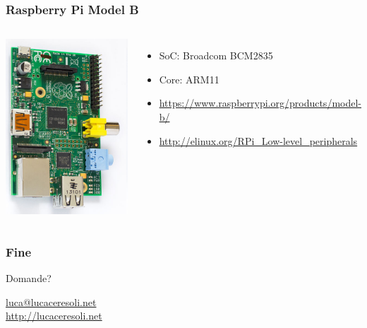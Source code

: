 \documentclass[xetex,table]{beamer}
\begin{document}
\begin{frame}
  \frametitle{Raspberry Pi Model B}
  \begin{columns}
    \includegraphics[width=\textwidth]{images/raspberry-pi-model-b.jpg}
    \begin{itemize}
    \item SoC: Broadcom BCM2835
    \item Core: ARM11
    \item \url{https://www.raspberrypi.org/products/model-b/}
    \item \url{http://elinux.org/RPi_Low-level_peripherals}
    \end{itemize}
  \end{columns}
\end{frame}

\begin{frame}
\frametitle{Fine}

  \begin{center}
    {\Huge Domande?}

    \vspace{0.1\textheight}

    \href{mailto:luca@lucaceresoli.net}{luca@lucaceresoli.net}\\
    \url{http://lucaceresoli.net}
  \end{center}
\end{frame}
\end{document}

